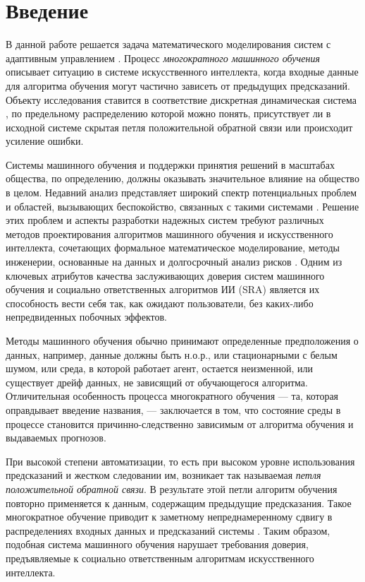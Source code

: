 \section{Введение}

В данной работе решается задача математического моделирования систем с адаптивным управлением \cite{andrievsky2019theory, emelyanov2014mathematical}. Процесс \emph{многократного машинного обучения} описывает ситуацию в системе искусственного интеллекта, когда входные данные для алгоритма обучения могут частично зависеть от предыдущих предсказаний. Объекту исследования ставится в соответствие дискретная динамическая система \cite{galor2007discrete, sandefur1990discrete}, по предельному распределению которой можно понять, присутствует ли в исходной системе скрытая петля положительной обратной связи или происходит усиление ошибки.

Системы машинного обучения и поддержки принятия решений в масштабах общества, по определению, должны оказывать значительное влияние на общество в целом. Недавний анализ \cite{cais2023statementairisk} представляет широкий спектр потенциальных проблем и областей, вызывающих беспокойство, связанных с такими системами \cite{suresh2020misplaced}. Решение этих проблем и  аспекты разработки надежных систем \cite{li2023trustworthy} требуют различных методов проектирования алгоритмов машинного обучения и искусственного интеллекта, сочетающих формальное математическое моделирование, методы инженерии, основанные на данных и долгосрочный анализ рисков \cite{sifakis2023trustworthy, pei2022requirements, he2021challenges}. Одним из ключевых атрибутов качества заслуживающих доверия систем машинного обучения \cite{serban2021practices,toreini2020relationship,siebert2020towards} и социально ответственных алгоритмов ИИ (SRA)\cite{cheng2021socially} является их способность вести себя так, как ожидают пользователи, без каких-либо непредвиденных побочных эффектов.

Методы машинного обучения обычно принимают определенные предположения о данных, например, данные должны быть н.о.р., или стационарными с белым шумом, или среда, в которой работает агент, остается неизменной, или существует дрейф данных, не зависящий от обучающегося алгоритма. Отличительная особенность процесса многократного обучения --- та, которая оправдывает введение названия, --- заключается в том, что состояние среды в процессе становится причинно-следственно зависимым от алгоритма обучения и выдаваемых прогнозов. 
    
При высокой степени автоматизации, то есть при высоком уровне использования предсказаний и жестком следовании им, возникает так называемая \emph{петля положительной обратной связи}. В результате этой петли алгоритм обучения повторно применяется к данным, содержащим предыдущие предсказания. Такое многократное обучение приводит к заметному непреднамеренному сдвигу в распределениях входных данных и предсказаний системы \citep{khritankov2023positive}. Таким образом, подобная система машинного обучения нарушает требования доверия, предъявляемые к социально ответственным алгоритмам искусственного интеллекта. 

